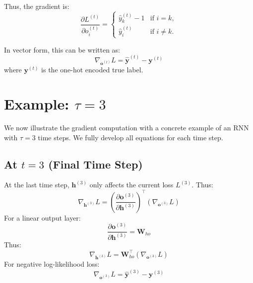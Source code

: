 \begin{notechapter}
Thus, the gradient is:
\[
\frac{\partial L^{(t)}}{\partial o_i^{(t)}} = 
\begin{cases}
\hat{y}_k^{(t)} - 1 & \text{if } i = k, \\
\hat{y}_i^{(t)} & \text{if } i \neq k.
\end{cases}
\]

In vector form, this can be written as:
\[
\nabla_{\mathbf{o}^{(t)}} L = \hat{\mathbf{y}}^{(t)} - \mathbf{y}^{(t)}
\]
where \(\mathbf{y}^{(t)}\) is the one-hot encoded true label.

\section{Example: \(\tau = 3\)}
We now illustrate the gradient computation with a concrete example of an 
RNN with \(\tau = 3\) time steps. We fully develop all equations for each 
time step.

\subsection{At \(t = 3\) (Final Time Step)}
At the last time step, \(\mathbf{h}^{(3)}\) only affects the current loss 
\(L^{(3)}\). Thus:
\[
\nabla_{\mathbf{h}^{(3)}} L = 
\left( \frac{\partial \mathbf{o}^{(3)}}{\partial \mathbf{h}^{(3)}} \right)^\top 
\left( \nabla_{\mathbf{o}^{(3)}} L \right)
\]
For a linear output layer:
\[
\frac{\partial \mathbf{o}^{(3)}}{\partial \mathbf{h}^{(3)}} = \mathbf{W}_{ho}
\]
Thus:
\[
\nabla_{\mathbf{h}^{(3)}} L = 
\mathbf{W}_{ho}^\top \left( \nabla_{\mathbf{o}^{(3)}} L \right)
\]
For negative log-likelihood loss:
\[
\nabla_{\mathbf{o}^{(3)}} L = \hat{\mathbf{y}}^{(3)} - \mathbf{y}^{(3)}
\]


\end{notechapter}
